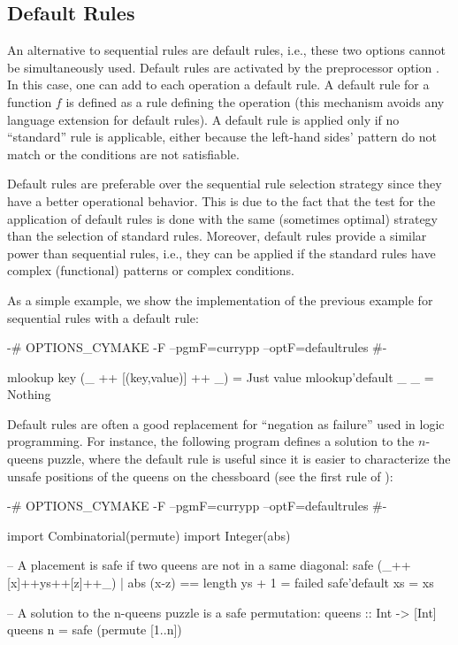 \subsection{Default Rules}

An alternative to sequential rules are default rules, i.e.,
these two options cannot be simultaneously used.
Default rules are activated by the preprocessor option
.
In this case, one can add to each operation a default rule.
A default rule for a function $f$ is defined as a rule
defining the operation  (this mechanism
avoids any language extension for default rules).
A default rule is applied only if no ``standard'' rule is
applicable, either because the left-hand sides' pattern do not match
or the conditions are not satisfiable.

Default rules are preferable over the sequential rule selection
strategy since they have a better operational behavior.
This is due to the fact that the test for the application
of default rules is done with the same (sometimes optimal)
strategy than the selection of standard rules.
Moreover, default rules provide a similar power than sequential rules,
i.e., they can be applied if the standard rules have
complex (functional) patterns or complex conditions.

As a simple example, we show the implementation of the
previous example for sequential rules with a default rule:
%
\begin{curry}
{-# OPTIONS_CYMAKE -F --pgmF=currypp --optF=defaultrules #-}

mlookup key (_ ++ [(key,value)] ++ _) = Just value
mlookup'default _   _                 = Nothing 
\end{curry}
%
Default rules are often a good replacement for ``negation as failure''
used in logic programming.
For instance, the following program defines a solution
to the $n$-queens puzzle, where the default rule is useful
since it is easier to characterize the unsafe positions
of the queens on the chessboard (see the first rule of ):
%
\begin{curry}
{-# OPTIONS_CYMAKE -F --pgmF=currypp --optF=defaultrules #-}

import Combinatorial(permute)
import Integer(abs)

-- A placement is safe if two queens are not in a same diagonal:
safe (_++[x]++ys++[z]++_) | abs (x-z) == length ys + 1 = failed
safe'default xs = xs

-- A solution to the n-queens puzzle is a safe permutation:
queens :: Int -> [Int]
queens n = safe (permute [1..n])
\end{curry}

